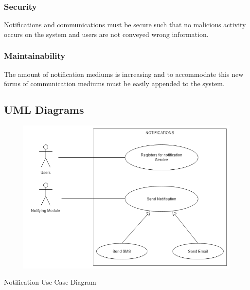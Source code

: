 \documentclass{article}
\begin{document}
    	\subsubsection{Security}    
    \begin{flushleft}
    Notifications and communications must be secure such that no malicious activity occurs on the system and users are not conveyed wrong information.
    \end{flushleft}
    
    	\subsubsection{Maintainability}    
    \begin{flushleft}
    The amount of notification mediums is increasing and to accommodate this new forms of communication mediums must be easily appended to the system.
    \end{flushleft}
    
    \clearpage
    \subsection{UML Diagrams}
    
    \begin{figure}[h!]
        \includegraphics[width=\textwidth]{Notifications_Use_Case.png}
    \end{figure}
    Notification Use Case Diagram
    
    \mbox{}\\
    \bigskip
    \clearpage
    
\end{document}
